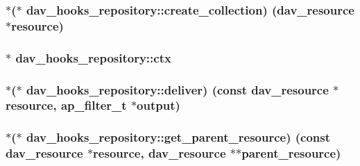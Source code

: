 \subsubsection[{\texorpdfstring{create\+\_\+collection}{create_collection}}]{$\ast$($\ast$ dav\+\_\+hooks\+\_\+repository\+::create\+\_\+collection) ({\bf dav\+\_\+resource} $\ast${\bf resource})}\hypertarget{structdav__hooks__repository_aca9f39a0d8645691369be75acef660e2}{}\label{structdav__hooks__repository_aca9f39a0d8645691369be75acef660e2}
\subsubsection[{\texorpdfstring{ctx}{ctx}}]{$\ast$ dav\+\_\+hooks\+\_\+repository\+::ctx}\hypertarget{structdav__hooks__repository_a673cbd066d3d57bb83a449eca19fa833}{}\label{structdav__hooks__repository_a673cbd066d3d57bb83a449eca19fa833}
\subsubsection[{\texorpdfstring{deliver}{deliver}}]{$\ast$($\ast$ dav\+\_\+hooks\+\_\+repository\+::deliver) (const {\bf dav\+\_\+resource} $\ast${\bf resource}, {\bf ap\+\_\+filter\+\_\+t} $\ast${\bf output})}\hypertarget{structdav__hooks__repository_a5d153efca7fc6581ecd225550a6cb813}{}\label{structdav__hooks__repository_a5d153efca7fc6581ecd225550a6cb813}
\subsubsection[{\texorpdfstring{get\+\_\+parent\+\_\+resource}{get_parent_resource}}]{$\ast$($\ast$ dav\+\_\+hooks\+\_\+repository\+::get\+\_\+parent\+\_\+resource) (const {\bf dav\+\_\+resource} $\ast${\bf resource}, {\bf dav\+\_\+resource} $\ast$$\ast$parent\+\_\+resource)}\hypertarget{structdav__hooks__repository_a3fdd98302c661567875db6d456ecdfe5}{}\label{structdav__hooks__repository_a3fdd98302c661567875db6d456ecdfe5}
